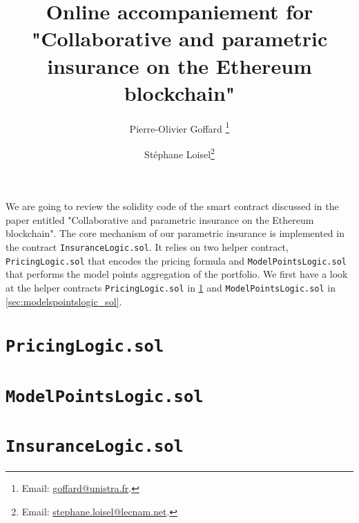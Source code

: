 \documentclass[10pt]{article}
\begin{document}
\title{Online accompaniement for "Collaborative and parametric insurance on the Ethereum blockchain"}
\author[1]{Pierre-Olivier Goffard \footnote{Email: \href{mailto:goffard@unistra.fr}{goffard@unistra.fr}.}}
\author[2]{Stéphane Loisel\footnote{Email: \href{mailto:stephane.loisel@lecnam.net}{stephane.loisel@lecnam.net}.}}

\maketitle
\vspace{3mm}


We are going to review the solidity code of the smart contract discussed in the paper entitled "Collaborative and parametric insurance on the Ethereum blockchain". The core mechanism of our parametric insurance is implemented in the contract \texttt{InsuranceLogic.sol}. It relies on two helper contract, \texttt{PricingLogic.sol} that encodes the pricing formula and \texttt{ModelPointsLogic.sol} that performs the model points aggregation of the portfolio. We first have a look at the helper contracts \texttt{PricingLogic.sol} in \cref{sec:pricinglogic_sol} and \texttt{ModelPointsLogic.sol} in \cref{sec:modelspointslogic_sol}.

\section{\texttt{PricingLogic.sol}}\label{sec:pricinglogic_sol}


\section{\texttt{ModelPointsLogic.sol}}\label{sec:modelpointslogic_sol}

\section{\texttt{InsuranceLogic.sol}}\label{sec:InsuranceLogic_sol}
\end{document}
